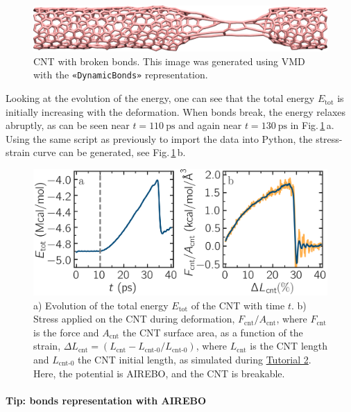 \documentclass[9pt,tutorial]{livecoms}
\newcommand{\guicmd}[1]{\textcolor{command}{\texttt{«#1»}}} %
\begin{document}
\begin{figure}
\centering
\includegraphics[width=\linewidth]{CNT-deformed-breakable}
\caption{CNT with broken bonds.  This image was generated using
VMD~\cite{vmd_home,humphrey1996vmd} with the \guicmd{DynamicBonds} representation.}
\label{fig:CNT-deformed-breakable}
\end{figure}

Looking at the evolution of the energy, one can see that the total
energy $E_\text{tot}$ is initially increasing with the deformation.  When
bonds break, the energy relaxes abruptly,
as can be seen near $t=110~\text{ps}$ and again near $t=130~\text{ps}$ in
Fig.\,\ref{fig:CNT-deformed-breakable}\,a.  Using the same script as previously to
import the data into Python, the stress-strain
curve can be generated, see Fig.\,\ref{fig:CNT-deformed-breakable}\,b.

\begin{figure}
\centering
\includegraphics[width=\linewidth]{CNT-breakable-stress-energy}
\caption{a) Evolution of the total energy $E_\text{tot}$ of the CNT with time $t$.
b) Stress applied on the CNT during deformation, $F_\text{cnt}/A_\text{cnt}$,
where $F_\text{cnt}$ is the force and $A_\text{cnt}$ the CNT surface area,
as a function of the strain, $\Delta L_\text{cnt} = (L_\text{cnt}-L_\text{cnt-0}/L_\text{cnt-0})$, where
$L_\text{cnt}$ is the CNT length and $L_\text{cnt-0}$ the CNT initial length,
as simulated during \hyperref[carbon-nanotube-label]{Tutorial 2}.
Here, the potential is AIREBO, and the CNT is breakable.}
\label{fig:CNT-breakable-energy-stress}
\end{figure}

\paragraph{Tip: bonds representation with AIREBO}
\end{document}

